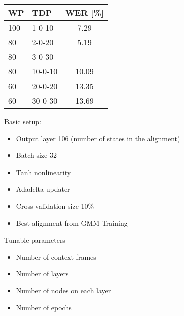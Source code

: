 \documentclass[11pt, a4paper, landscape]{article}
\begin{document}
\begin{center}
	\begin{tabular}{| l | l | c |} \toprule
		WP  &  TDP      &    WER [\%]     \\ \midrule
		100 &  1-0-10   &    7.29         \\
		80  &  2-0-20   &    5.19         \\
		80  &  3-0-30   &\color{red}{4.70}\\ \midrule
		80  &  10-0-10  &    10.09        \\
		60  &  20-0-20  &    13.35        \\
		60  &  30-0-30  &    13.69        \\ \bottomrule		
	\end{tabular}
\end{center}
%
\vfill

\NewPage{}
Basic setup:
\begin{itemize}
  \item Output layer 106 (number of states in the alignment)
  \item Batch size 32 
  \item Tanh nonlinearity
  \item Adadelta updater
  \item Cross-validation size 10\%
  \item Best alignment from GMM Training
\end{itemize}
Tunable parameters
\begin{itemize}
	\item Number of context frames
	\item Number of layers
	\item Number of nodes on each layer
	\item Number of epochs
\end{itemize}
\end{document}
